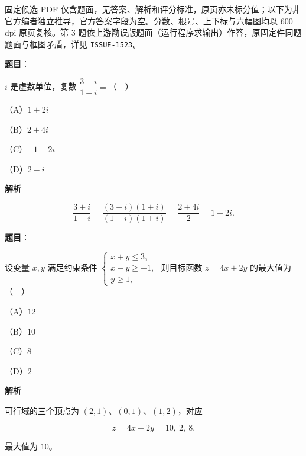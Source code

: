 

\begin{gktip}
固定候选 PDF 仅含题面，无答案、解析和评分标准，原页亦未标分值；以下为非官方编者独立推导，官方答案字段为空。分数、根号、上下标与六幅图均以 600 dpi 原页复核。第 3 题依上游勘误版题面（运行程序求输出）作答，原固定件同题题面与框图矛盾，详见 \texttt{ISSUE-1523}。
\end{gktip}

\begin{answer}

\textbf{题目}：

$i$ 是虚数单位，复数 $\dfrac{3+i}{1-i}=$（　）

（A）$1+2i$

（B）$2+4i$

（C）$-1-2i$

（D）$2-i$

\textbf{解析}

\nopagebreak[4]
\[\frac{3+i}{1-i}=\frac{(3+i)(1+i)}{(1-i)(1+i)}
=\frac{2+4i}2=1+2i.\]


\end{answer}
\begin{answer}

\textbf{题目}：

设变量 $x,y$ 满足约束条件 $\begin{cases}x+y\leqslant3,\\ x-y\geqslant-1,\\ y\geqslant1,\end{cases}$ 则目标函数 $z=4x+2y$ 的最大值为（　）

（A）$12$

（B）$10$

（C）$8$

（D）$2$

\textbf{解析}

可行域的三个顶点为 $(2,1)$、$(0,1)$、$(1,2)$，对应

\nopagebreak[4]
\[z=4x+2y=10,\ 2,\ 8.\]

最大值为 $10$。


\end{answer}

